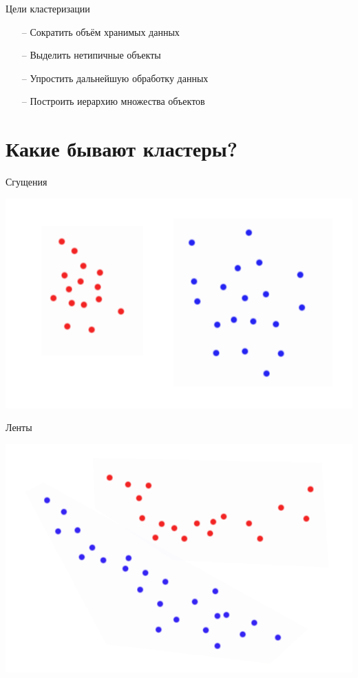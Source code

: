 \documentclass[10pt]{beamer}
\begin{document}
\begin{frame}{Цели кластеризации}
	\begin{itemize} [<+- | alert@+>]
		\item[--] Сократить объём хранимых данных
		\item[--] Выделить нетипичные объекты
		\item[--] Упростить дальнейшую обработку данных
		\item[--] Построить иерархию множества объектов				
	\end{itemize}
\end{frame}

\section{Какие бывают кластеры?}

\begin{frame}{Сгущения}
	\begin{center}
    \includegraphics[height=0.8 \textheight, keepaspectratio = true]{images/cluster1}  
	\end{center}
\end{frame}


\begin{frame}{Ленты}
	\begin{center}
	  \includegraphics[height=0.8 \textheight, keepaspectratio = true]{images/cluster2}  
	\end{center}
\end{frame}
\end{document}
